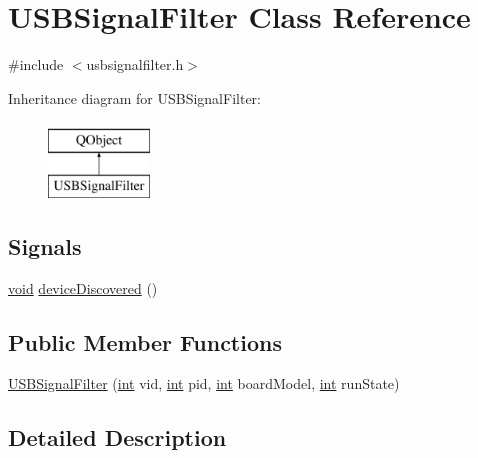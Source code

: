 \hypertarget{class_u_s_b_signal_filter}{\section{U\-S\-B\-Signal\-Filter Class Reference}
\label{class_u_s_b_signal_filter}
}


{\ttfamily \#include $<$usbsignalfilter.\-h$>$}

Inheritance diagram for U\-S\-B\-Signal\-Filter\-:\begin{figure}[H]
\begin{center}
\leavevmode
\includegraphics[height=2.000000cm]{class_u_s_b_signal_filter}
\end{center}
\end{figure}
\subsection*{Signals}
\begin{DoxyCompactItemize}
\item 
\hyperlink{group___u_a_v_objects_plugin_ga444cf2ff3f0ecbe028adce838d373f5c}{void} \hyperlink{class_u_s_b_signal_filter_a9d88c3bd1d000b31ad72af4735edaaf2}{device\-Discovered} ()
\end{DoxyCompactItemize}
\subsection*{Public Member Functions}
\begin{DoxyCompactItemize}
\item 
\hyperlink{class_u_s_b_signal_filter_aeb1142598d1c4c45e0e8b400e07ad003}{U\-S\-B\-Signal\-Filter} (\hyperlink{ioapi_8h_a787fa3cf048117ba7123753c1e74fcd6}{int} vid, \hyperlink{ioapi_8h_a787fa3cf048117ba7123753c1e74fcd6}{int} pid, \hyperlink{ioapi_8h_a787fa3cf048117ba7123753c1e74fcd6}{int} board\-Model, \hyperlink{ioapi_8h_a787fa3cf048117ba7123753c1e74fcd6}{int} run\-State)
\end{DoxyCompactItemize}


\subsection{Detailed Description}


